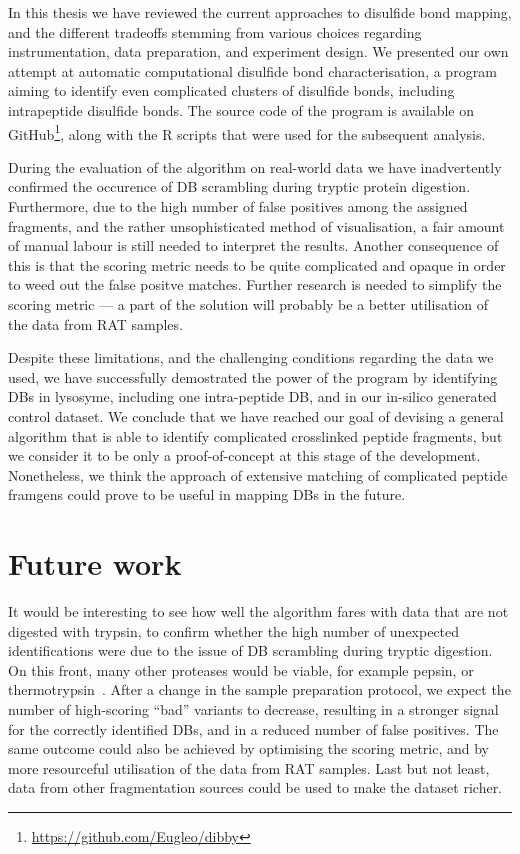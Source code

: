 
In this thesis we have reviewed the current approaches to disulfide bond mapping, and the different tradeoffs stemming from various choices regarding instrumentation, data preparation, and experiment design. We presented our own attempt at automatic computational disulfide bond characterisation, a program aiming to identify even complicated clusters of disulfide bonds, including intrapeptide disulfide bonds. The source code of the program is available on GitHub\footnote{\url{https://github.com/Eugleo/dibby}}, along with the R scripts that were used for the subsequent analysis.

During the evaluation of the algorithm on real-world data we have inadvertently confirmed the occurence of DB scrambling during tryptic protein digestion. Furthermore, due to the high number of false positives among the assigned fragments, and the rather unsophisticated method of visualisation, a fair amount of manual labour is still needed to interpret the results. Another consequence of this is that the scoring metric needs to be quite complicated and opaque in order to weed out the false positve matches. Further research is needed to simplify the scoring metric --- a part of the solution will probably be a better utilisation of the data from RAT samples.

Despite these limitations, and the challenging conditions regarding the data we used, we have successfully demostrated the power of the program by identifying DBs in lysosyme, including one intra-peptide DB, and in our in-silico generated control dataset. We conclude that we have reached our goal of devising a general algorithm that is able to identify complicated crosslinked peptide fragments, but we consider it to be only a proof-of-concept at this stage of the development. Nonetheless, we think the approach of extensive matching of complicated peptide framgens could prove to be useful in mapping DBs in the future.

\section*{Future work}

It would be interesting to see how well the algorithm fares with data that are not digested with trypsin, to confirm whether the high number of unexpected identifications were due to the issue of DB scrambling during tryptic digestion. On this front, many other proteases would be viable, for example pepsin, or thermotrypsin~\cite{sung2016evaluation}. After a change in the sample preparation protocol, we expect the number of high-scoring ``bad'' variants to decrease, resulting in a stronger signal for the correctly identified DBs, and in a reduced number of false positives. The same outcome could also be achieved by optimising the scoring metric, and by more resourceful utilisation of the data from RAT samples. Last but not least, data from other fragmentation sources could be used to make the dataset richer.

